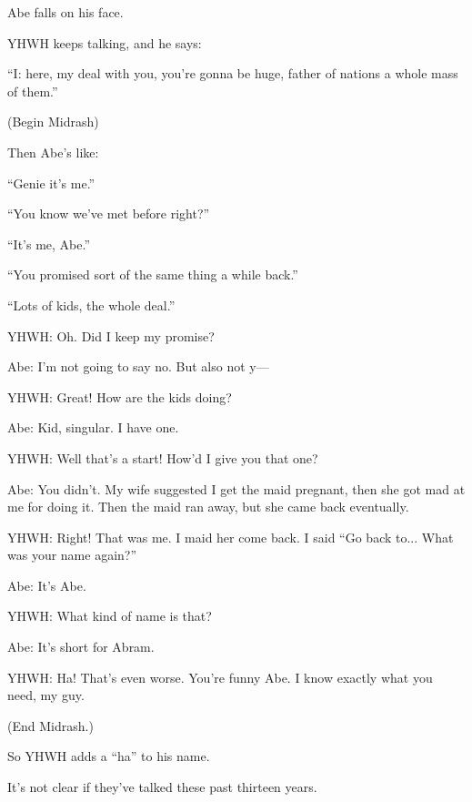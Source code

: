 {
}
{
}
{
	Abe falls on his face.
	
	YHWH keeps talking, and he says:
}

{
}
{
}
{
	``I: here, my deal with you, you're gonna be huge,
	father of nations a whole mass of them.''
	
	(Begin Midrash)
	
	Then Abe's like:
	
	``Genie it's me.''

	``You know we've met before right?''

	``It's me, Abe.''

	``You promised sort of the same thing a while back.''

	``Lots of kids, the whole deal.''

	YHWH: Oh. Did I keep my promise?

	Abe: I'm not going to say no. But also not y---

	YHWH: Great! How are the kids doing?

	Abe: Kid, singular. I have one.

	YHWH: Well that's a start! How'd I give you that one?

	Abe: You didn't. My wife suggested I get the maid pregnant,
	then she got mad at me for doing it. Then the maid ran away,
	but she came back eventually.

	YHWH: Right! That was me. I maid her come back. I said ``Go back to... What was your name again?''

	Abe: It's Abe.

	YHWH: What kind of name is that?

	Abe: It's short for Abram.

	YHWH: Ha! That's even worse. You're funny Abe. I know exactly what you need, my guy.

	(End Midrash.)
}

{
}
{
}
{
	So YHWH adds a ``ha'' to his name.

	It's not clear if they've talked these past thirteen years.
}

